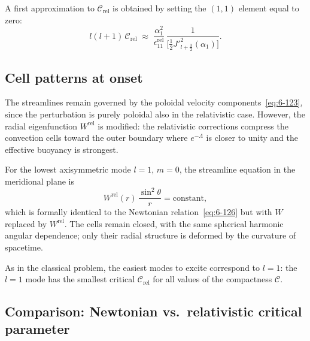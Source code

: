 A first approximation to $\mathcal{C}_{\mathrm{rel}}$ is obtained by
setting the $(1,1)$ element equal to zero:
\begin{equation}
\label{eq:rel-59-C1approx}
l(l+1)\,\mathcal{C}_{\mathrm{rel}}
  \;\approx\;
  \frac{\alpha_{1}^{2}}
       {\epsilon_{11}^{\mathrm{rel}}}\,
  \frac{1}{\bigl[\tfrac{1}{2}J'^{2}_{l+\frac{3}{2}}(\alpha_{1})
        \bigr]}.
\end{equation}

\subsection{Cell patterns at onset}
\label{sec:rel-59-cells}

The streamlines remain governed by the poloidal velocity
components~\eqref{eq:6-123}, since the perturbation is purely poloidal
also in the relativistic case.  However, the radial eigenfunction
$W^{\mathrm{rel}}$ is modified: the relativistic corrections compress
the convection cells toward the outer boundary where
$e^{-\Lambda}$ is closer to unity and the effective buoyancy is
strongest.

For the lowest axisymmetric mode $l=1$, $m=0$, the streamline
equation in the meridional plane is
\begin{equation}
\label{eq:rel-59-stream}
W^{\mathrm{rel}}(r)\,\frac{\sin^{2}\theta}{r}
  = \text{constant},
\end{equation}
which is formally identical to the Newtonian
relation~\eqref{eq:6-126} but with $W$ replaced by
$W^{\mathrm{rel}}$.  The cells remain closed, with the same spherical
harmonic angular dependence; only their radial structure is deformed
by the curvature of spacetime.

As in the classical problem, the easiest modes to excite correspond
to $l=1$: the $l=1$ mode has the smallest critical
$\mathcal{C}_{\mathrm{rel}}$ for all values of the compactness
$\mathscr{C}$.

\subsection{Comparison: Newtonian vs.\ relativistic critical
parameter}
\label{sec:rel-59-comparison}

